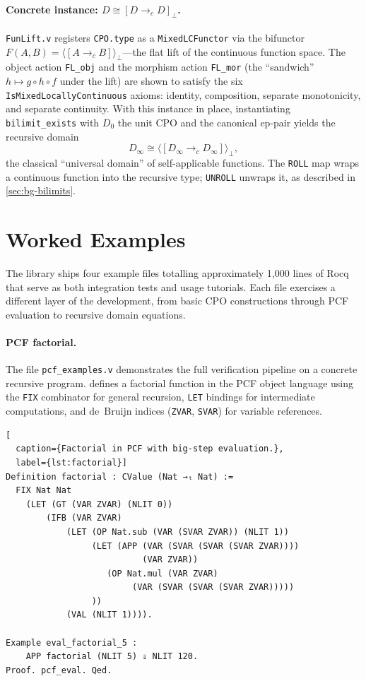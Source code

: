 \paragraph{Concrete instance: $D \cong [D \to_c D]_\bot$.}
\texttt{FunLift.v} registers \texttt{CPO.type} as a
\texttt{MixedLCFunctor} via the bifunctor
$F(A, B) = \langle [A \to_c B] \rangle_\bot$---the flat lift of the
continuous function space.  The object action \texttt{FL\_obj} and the
morphism action \texttt{FL\_mor} (the ``sandwich''
$h \mapsto g \circ h \circ f$ under the lift) are shown to satisfy
the six \texttt{IsMixed\-Locally\-Continuous} axioms: identity,
composition, separate monotonicity, and separate continuity.  With
this instance in place, instantiating \texttt{bilimit\_exists} with
$D_0$ the unit CPO and the canonical ep-pair yields the recursive
domain
\[
  D_\infty \cong \langle [D_\infty \to_c D_\infty] \rangle_\bot,
\]
the classical ``universal domain'' of self-applicable functions.  The
\texttt{ROLL} map wraps a continuous function into the recursive type;
\texttt{UNROLL} unwraps it, as described in \cref{sec:bg-bilimits}.

\section{Worked Examples}
\label{sec:res-examples}

The library ships four example files totalling approximately 1{,}000
lines of Rocq that serve as both integration tests and usage tutorials.
Each file exercises a different layer of the development, from basic
CPO constructions through PCF evaluation to recursive domain equations.

\paragraph{PCF factorial.}
The file \texttt{pcf\_examples.v} demonstrates the full verification
pipeline on a concrete recursive program.
 defines a factorial function in the PCF object
language using the \texttt{FIX} combinator for general recursion,
\texttt{LET} bindings for intermediate computations, and de~Bruijn
indices (\texttt{ZVAR}, \texttt{SVAR}) for variable references.

\begin{lstlisting}[
  caption={Factorial in PCF with big-step evaluation.},
  label={lst:factorial}]
Definition factorial : CValue (Nat →ₜ Nat) :=
  FIX Nat Nat
    (LET (GT (VAR ZVAR) (NLIT 0))
        (IFB (VAR ZVAR)
            (LET (OP Nat.sub (VAR (SVAR ZVAR)) (NLIT 1))
                 (LET (APP (VAR (SVAR (SVAR (SVAR ZVAR))))
                           (VAR ZVAR))
                    (OP Nat.mul (VAR ZVAR)
                         (VAR (SVAR (SVAR (SVAR ZVAR)))))
                 ))
            (VAL (NLIT 1)))).

Example eval_factorial_5 :
    APP factorial (NLIT 5) ⇓ NLIT 120.
Proof. pcf_eval. Qed.
\end{lstlisting}

